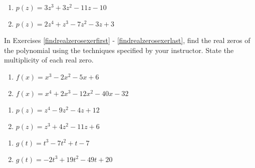 \documentclass{ximera}
\begin{document}
\begin{multicols}{2}
\begin{enumerate}
\setcounter{enumi}{\value{HW}}

\item $p(z) = 3z^{3} + 3z^{2} - 11z - 10$
\item $p(z) = 2z^4+z^3-7z^2-3z+3$ \label{prelimpolystufflast}


\setcounter{HW}{\value{enumi}}
\end{enumerate}
\end{multicols}


In Exercises \ref{findrealzerosexerfirst} - \ref{findrealzerosexerlast}, find the real zeros of the polynomial using the techniques specified by your instructor.  State the multiplicity of each real zero.


\begin{multicols}{2}
\begin{enumerate}
\setcounter{enumi}{\value{HW}}

\item $f(x) = x^{3} - 2x^{2} - 5x + 6$ \label{findrealzerosexerfirst}
\item $f(x) = x^{4} + 2x^{3} - 12x^{2} - 40x - 32$

\setcounter{HW}{\value{enumi}}
\end{enumerate}
\end{multicols}

\begin{multicols}{2}
\begin{enumerate}
\setcounter{enumi}{\value{HW}}

\item $p(z) = z^{4} - 9z^{2} - 4z + 12$
\item $p(z) = z^{3} + 4z^{2} - 11z + 6$

\setcounter{HW}{\value{enumi}}
\end{enumerate}
\end{multicols}

\begin{multicols}{2}
\begin{enumerate}
\setcounter{enumi}{\value{HW}}

\item $g(t) = t^{3} - 7t^{2} + t - 7$
\item $g(t) = -2t^{3} + 19t^{2} - 49t + 20$

\setcounter{HW}{\value{enumi}}
\end{enumerate}
\end{multicols}
\end{document}
